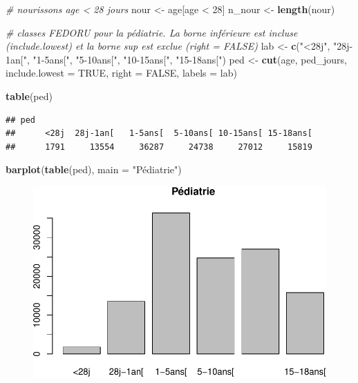 \documentclass[]{article}
\newenvironment{Shaded}{\begin{snugshade}}{\end{snugshade}}
\newcommand{\KeywordTok}[1]{\textcolor[rgb]{0.13,0.29,0.53}{\textbf{{#1}}}}
\newcommand{\DataTypeTok}[1]{\textcolor[rgb]{0.13,0.29,0.53}{{#1}}}
\newcommand{\DecValTok}[1]{\textcolor[rgb]{0.00,0.00,0.81}{{#1}}}
\newcommand{\StringTok}[1]{\textcolor[rgb]{0.31,0.60,0.02}{{#1}}}
\newcommand{\CommentTok}[1]{\textcolor[rgb]{0.56,0.35,0.01}{\textit{{#1}}}}
\newcommand{\OtherTok}[1]{\textcolor[rgb]{0.56,0.35,0.01}{{#1}}}
\newcommand{\NormalTok}[1]{{#1}}
\begin{document}
\begin{Shaded}
\begin{Highlighting}[]
\CommentTok{# nourissons age < 28 jours}
\NormalTok{nour <-}\StringTok{ }\NormalTok{age[age <}\StringTok{ }\DecValTok{28}\NormalTok{]}
\NormalTok{n_nour <-}\StringTok{ }\KeywordTok{length}\NormalTok{(nour)}

\CommentTok{# classes FEDORU pour la pédiatrie. La borne inférieure est incluse (include.lowest) et la borne sup est exclue (right = FALSE)}
\NormalTok{lab <-}\StringTok{ }\KeywordTok{c}\NormalTok{(}\StringTok{"<28j"}\NormalTok{, }\StringTok{"28j-1an["}\NormalTok{, }\StringTok{"1-5ans["}\NormalTok{, }\StringTok{"5-10ans["}\NormalTok{, }\StringTok{"10-15ans["}\NormalTok{, }\StringTok{"15-18ans["}\NormalTok{)}
\NormalTok{ped <-}\StringTok{ }\KeywordTok{cut}\NormalTok{(age, ped_jours, }\DataTypeTok{include.lowest =} \OtherTok{TRUE}\NormalTok{, }\DataTypeTok{right =} \OtherTok{FALSE}\NormalTok{, }\DataTypeTok{labels =} \NormalTok{lab)}

\KeywordTok{table}\NormalTok{(ped)}
\end{Highlighting}
\end{Shaded}

\begin{verbatim}
## ped
##      <28j  28j-1an[   1-5ans[  5-10ans[ 10-15ans[ 15-18ans[ 
##      1791     13554     36287     24738     27012     15819
\end{verbatim}

\begin{Shaded}
\begin{Highlighting}[]
\KeywordTok{barplot}\NormalTok{(}\KeywordTok{table}\NormalTok{(ped), }\DataTypeTok{main =} \StringTok{"Pédiatrie"}\NormalTok{)}
\end{Highlighting}
\end{Shaded}

\begin{figure}[htbp]
\centering
\includegraphics{age_files/figure-latex/ped-3.pdf}
\end{figure}
\end{document}
